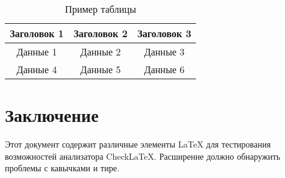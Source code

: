 \documentclass[12pt,a4paper]{article}
\begin{document}
\begin{table}[h]
\centering
\begin{tabular}{|c|c|c|}
\hline
Заголовок 1 & Заголовок 2 & Заголовок 3 \\
\hline
Данные 1 & Данные 2 & Данные 3 \\
\hline
Данные 4 & Данные 5 & Данные 6 \\
\hline
\end{tabular}
\caption{Пример таблицы}
\label{tab:example}
\end{table}

\section{Заключение}

Этот документ содержит различные элементы LaTeX для тестирования возможностей 
анализатора CheckLaTeX. Расширение должно обнаружить проблемы с кавычками и тире.
\end{document}
